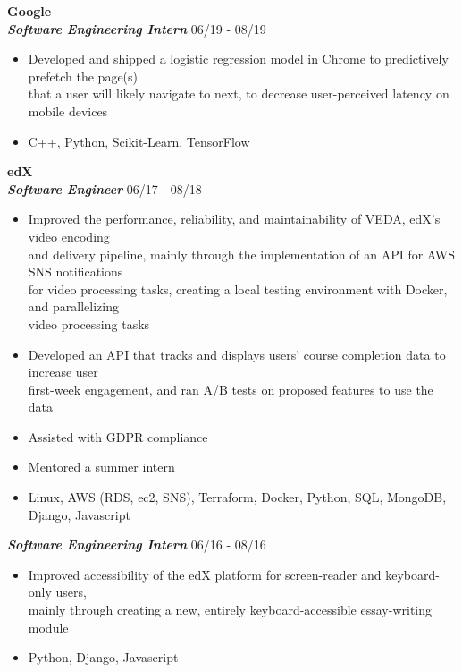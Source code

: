 \documentclass{res}
\begin{document}
\begin{resume}
\textbf{\large{Google}} 
\vspace{1mm} \\
\textbf{\textit{Software Engineering Intern}} \hfill 06/19 - 08/19 \\
	\begin{itemize}   \itemsep -1pt %
	\item Developed and shipped a logistic regression model in Chrome to predictively prefetch the page(s) \\
	that a user will likely navigate to next, to decrease user-perceived latency on mobile devices
	\item C++, Python, Scikit-Learn, TensorFlow
	\end{itemize}
\vspace{3mm}

\textbf{\large{edX}}
\vspace{1mm} \\
\textbf{\textit{Software Engineer}} \hfill 06/17 - 08/18 \\ 
	\begin{itemize}  \itemsep -1pt %
	\item Improved the performance, reliability, and maintainability of VEDA, edX's video encoding \\
		and delivery pipeline, mainly through the implementation of an API for AWS SNS notifications \\
		for video processing tasks, creating a local testing environment with Docker, and parallelizing \\
		video processing tasks
	\item Developed an API that tracks and displays users' course completion data to increase user \\
		first-week engagement, and ran A/B tests on proposed features to use the data 
	\item Assisted with GDPR compliance
	\item Mentored a summer intern
	\item Linux, AWS (RDS, ec2, SNS), Terraform, Docker, Python, SQL, MongoDB, Django, Javascript
	\end{itemize}
\textbf{\textit{Software Engineering Intern}} \hfill 06/16 - 08/16 \\
	\begin{itemize}  \itemsep -1pt %
	\item Improved accessibility of the edX platform for screen-reader and keyboard-only users, \\
		mainly through creating a new, entirely keyboard-accessible essay-writing module
	\item Python, Django, Javascript
	\end{itemize}
\vspace{3mm}


\end{resume}
\end{document}

